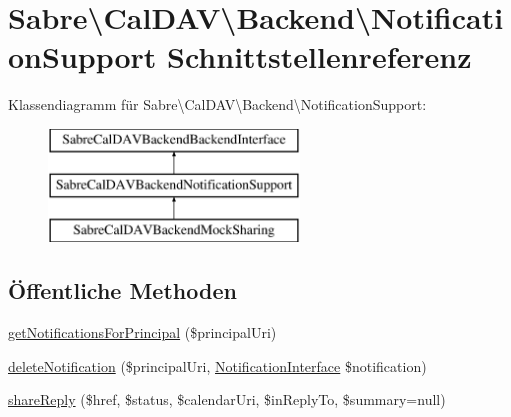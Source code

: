 \hypertarget{interface_sabre_1_1_cal_d_a_v_1_1_backend_1_1_notification_support}{}\section{Sabre\textbackslash{}Cal\+D\+AV\textbackslash{}Backend\textbackslash{}Notification\+Support Schnittstellenreferenz}
\label{interface_sabre_1_1_cal_d_a_v_1_1_backend_1_1_notification_support}
Klassendiagramm für Sabre\textbackslash{}Cal\+D\+AV\textbackslash{}Backend\textbackslash{}Notification\+Support\+:\begin{figure}[H]
\begin{center}
\leavevmode
\includegraphics[height=3.000000cm]{interface_sabre_1_1_cal_d_a_v_1_1_backend_1_1_notification_support}
\end{center}
\end{figure}
\subsection*{Öffentliche Methoden}
\begin{DoxyCompactItemize}
\item 
\mbox{\hyperlink{interface_sabre_1_1_cal_d_a_v_1_1_backend_1_1_notification_support_a80acc162d3dc807dc1eefa36c6b7cced}{get\+Notifications\+For\+Principal}} (\$principal\+Uri)
\item 
\mbox{\hyperlink{interface_sabre_1_1_cal_d_a_v_1_1_backend_1_1_notification_support_acb6eb34436a6dd471cdd963af285c22f}{delete\+Notification}} (\$principal\+Uri, \mbox{\hyperlink{interface_sabre_1_1_cal_d_a_v_1_1_xml_1_1_notification_1_1_notification_interface}{Notification\+Interface}} \$notification)
\item 
\mbox{\hyperlink{interface_sabre_1_1_cal_d_a_v_1_1_backend_1_1_notification_support_a689057e6de75fb97ca88a3af4bba4d62}{share\+Reply}} (\$href, \$status, \$calendar\+Uri, \$in\+Reply\+To, \$summary=null)
\end{DoxyCompactItemize}


